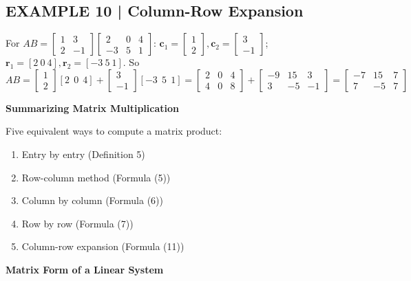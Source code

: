 \documentclass{article}
\newcommand{\redheading}[1]{{\vspace{2mm}\noindent\Large\bfseries\color{red!55!black} #1\par}\vspace{2mm}}
\theoremstyle{mystyle}
\begin{document}
\subsection*{EXAMPLE 10 | Column-Row Expansion}
For $AB=\begin{bmatrix}1&3\\2&-1\end{bmatrix}\begin{bmatrix}2&0&4\\-3&5&1\end{bmatrix}$: $\mathbf{c}_1=\begin{bmatrix}1\\2\end{bmatrix},\mathbf{c}_2=\begin{bmatrix}3\\-1\end{bmatrix}$; $\mathbf{r}_1=[2\ 0\ 4],\mathbf{r}_2=[-3\ 5\ 1]$. So
\[
AB=\begin{bmatrix}1\\2\end{bmatrix}[2\ \ 0\ \ 4]+\begin{bmatrix}3\\-1\end{bmatrix}[-3\ \ 5\ \ 1]
=\begin{bmatrix}2&0&4\\4&0&8\end{bmatrix}+\begin{bmatrix}-9&15&3\\3&-5&-1\end{bmatrix}
=\begin{bmatrix}-7&15&7\\7&-5&7\end{bmatrix}
\]

\redheading{Summarizing Matrix Multiplication}

Five equivalent ways to compute a matrix product:
\begin{enumerate}
    \item Entry by entry (Definition 5)
    \item Row-column method (Formula (5))
    \item Column by column (Formula (6))
    \item Row by row (Formula (7))
    \item Column-row expansion (Formula (11))
\end{enumerate}

\redheading{Matrix Form of a Linear System}
\end{document}
